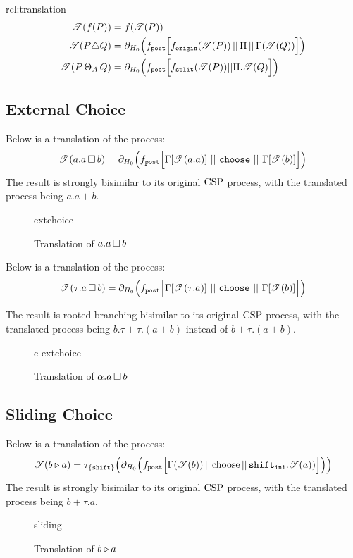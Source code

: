 \documentclass[../hons_project.tex]{subfiles}
\begin{document}
\begin{rcl}[Translation]{rcl:translation}{}
\begin{align*}
		\mathscr{T}(f(P))           & = f(\mathscr{T}(P))                                                                                                                                                                               \\
		\mathscr{T}(P \triangle Q) & = \partial_{H_{0}}\Bigl(f_{\mathtt{post}}\Bigl[ f_{\mathtt{origin}}(\mathscr{T}(P)) \,\vert\vert\, \Pi \,\vert\vert\, \Gamma(\mathscr{T}(Q)) \Bigr]\Bigr)                                                                          \\
		\mathscr{T}(P \,\Theta_{A}\, Q)     & = \partial_{H_{0}}\Bigl(f_{\mathtt{post}} \Bigl[ f_{\mathtt{split}}(\mathscr{T}(P)) | | \Pi.\mathscr{T}(Q) \Bigr]\Bigr)
	\end{align*}
\end{rcl}

\newpage
\subsection{External Choice}\label{ssec:diagrams-extchoice}
Below is a translation of the process:
\[\mathscr{T}(a.a \,\square\, b) = \partial_{H_{0}}\Bigl(f_{\mathtt{post}}\Bigl[\Gamma[\mathscr{T}(a.a)]\, \,\vert\vert\, \,\mathtt{choose}\, \,\vert\vert\, \,\Gamma[\mathscr{T}(b)]\Bigl]\Bigr)\]
The result is strongly bisimilar to its original $\mathrm{CSP}$ process, with the translated process being $a.a + b$.
\begin{figure}[H]
	\centering
	{extchoice}
	\caption{Translation of $a.a \,\square\, b$}
\end{figure}
Below is a translation of the process:
\[\mathscr{T}(\tau.a \,\square\, b) = \partial_{H_{0}}\Bigl(f_{\mathtt{post}}\Bigl[\Gamma[\mathscr{T}(\tau.a)]\, \,\vert\vert\, \,\mathtt{choose}\, \,\vert\vert\, \,\Gamma[\mathscr{T}(b)]\Bigl]\Bigr)\]

The result is rooted branching bisimilar to its original $\mathrm{CSP}$ process, with the translated process being $b.\tau + \tau.(a + b)$ instead of $b + \tau.(a + b)$.

\begin{figure}[H]
	{c-extchoice}
	\caption{Translation of $\alpha.a \,\square\, b$}
\end{figure}


\subsection{Sliding Choice}\label{ssec:diagrams-sliding}
Below is a translation of the process:
\[\mathscr{T}(b \triangleright a)    = \tau_{\{\mathtt{shift}\}}\Bigl(\partial_{H_{0}}\Bigl(f_{\mathtt{post}}\Bigl[ \Gamma(\mathscr{T}(b)) \,\vert\vert\, \mathrm{choose} \,\vert\vert\, \mathtt{shift}_{\mathtt{ini}} . \mathscr{T}(a)) \Bigr]\Bigr)\Bigr)\]
The result is strongly bisimilar to its original $\mathrm{CSP}$ process, with the translated process being $b + \tau.a$.
\begin{figure}[H]
	{sliding}
	\caption{Translation of $b \triangleright a$}
\end{figure}
\end{document}
